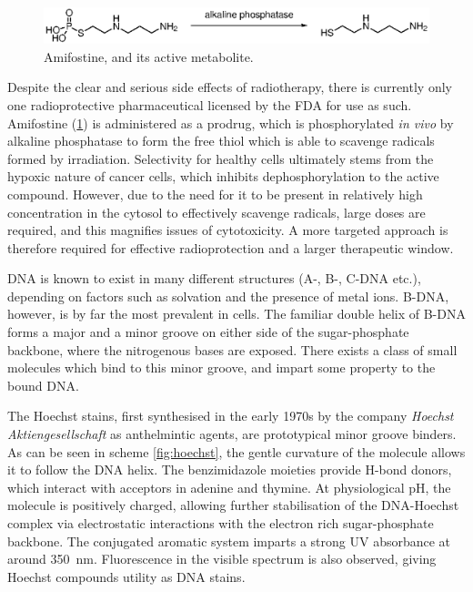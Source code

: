 \begin{refsection}
\begin{figure}
\centering
\includegraphics[scale=0.74]{Figures/amifostine.eps}
\caption{Amifostine, and its active metabolite.}\label{fig:amifostine}
\end{figure}

Despite the clear and serious side effects of radiotherapy, there is currently only one radioprotective pharmaceutical licensed by the FDA for use as such.
Amifostine (\cref{fig:amifostine}) is administered as a prodrug, which is phosphorylated \emph{in vivo} by alkaline phosphatase to form the free thiol which is able to scavenge radicals formed by irradiation.
Selectivity for healthy cells ultimately stems from the hypoxic nature of cancer cells, which inhibits dephosphorylation to the active compound\autocite{Kouvaris2007}.
However, due to the need for it to be present in relatively high concentration in the cytosol to effectively scavenge radicals, large doses are required, and this magnifies issues of cytotoxicity.
A more targeted approach is therefore required for effective radioprotection and a larger therapeutic window.

DNA is known to exist in many different structures (A-, B-, C-DNA etc.), depending on factors such as solvation and the presence of metal ions.
B-DNA, however, is by far the most prevalent in cells\autocite{Miyahara2012}.
The familiar double helix of B-DNA forms a major and a minor groove on either side of the sugar-phosphate backbone, where the nitrogenous bases are exposed.
There exists a class of small molecules which bind to this minor groove, and impart some property to the bound DNA.\@

The Hoechst stains, first synthesised in the early 1970s by the company \emph{Hoechst Aktiengesellschaft} as anthelmintic agents, are prototypical minor groove binders.
As can be seen in scheme \cref{fig:hoechst}, the gentle curvature of the molecule allows it to follow the DNA helix.
The benzimidazole moieties provide H-bond donors, which interact with acceptors in adenine and thymine.
At physiological pH, the molecule is positively charged, allowing further stabilisation of the DNA-Hoechst complex via electrostatic interactions with the electron rich sugar-phosphate backbone\autocite{Teng1988}.
The conjugated aromatic system imparts a strong UV absorbance at around \SI{350}{\nm}. Fluorescence in the visible spectrum is also observed, giving Hoechst compounds utility as DNA stains.


\end{refsection}
